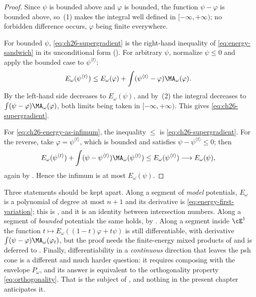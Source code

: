 \begin{proof}
Since $\psi$ is bounded above and $\varphi$ is bounded, the function
$\psi-\varphi$ is bounded above, so
\,(1) makes the integral well defined in
$[-\infty,+\infty)$; no forbidden difference occurs, $\varphi$ being
finite everywhere.

For bounded $\psi$, \eqref{eq:ch26-supergradient} is the right-hand
inequality of \eqref{eq:energy-sandwich} in its unconditional form
().  For arbitrary $\psi$, normalize
$\psi\leq0$ and apply the bounded case to
$\psi^{\langle t\rangle}$:
\[
 E_\omega(\psi^{\langle t\rangle})
 \leq E_\omega(\varphi)
   +\int(\psi^{\langle t\rangle}-\varphi)\MA_\omega(\varphi).
\]
By  the left-hand side decreases to
$E_\omega(\psi)$, and by
\,(2) the integral decreases to
$\int(\psi-\varphi)\MA_\omega(\varphi)$, both limits being taken in
$[-\infty,+\infty)$.  This gives \eqref{eq:ch26-supergradient}.

For \eqref{eq:ch26-energy-as-infimum}, the inequality $\leq$ is
\eqref{eq:ch26-supergradient}.  For the reverse, take
$\varphi=\psi^{\langle t\rangle}$, which is bounded and satisfies
$\psi-\psi^{\langle t\rangle}\leq0$; then
\[
 E_\omega(\psi^{\langle t\rangle})
  +\int(\psi-\psi^{\langle t\rangle})
    \MA_\omega(\psi^{\langle t\rangle})
 \leq E_\omega(\psi^{\langle t\rangle})
 \longrightarrow E_\omega(\psi),
\]
again by .  Hence the infimum is at most
$E_\omega(\psi)$.
\end{proof}

\begin{remark}
\label{rem:ch26-differentiability-scope}
Three statements should be kept apart.  Along a segment of \emph{model}
potentials, $E_\omega$ is a polynomial of degree at most $n+1$ and its
derivative is \eqref{eq:energy-first-variation}; this is
, and it is an identity between intersection
numbers.  Along a segment of \emph{bounded} potentials the same holds, by
.  Along a segment inside $\cE^1$ the
function $t\mapsto E_\omega((1-t)\varphi+t\psi)$ is still differentiable,
with derivative $\int(\psi-\varphi)\MA_\omega(\varphi_t)$, but the proof
needs the finite-energy mixed products of
 and is deferred to
.  Finally, differentiability in a
\emph{continuous} direction that leaves the psh cone is a different and much
harder question: it requires composing with the envelope $P_\omega$, and
its answer is equivalent to the orthogonality property
\eqref{eq:orthogonality}.  That is the subject of
, and nothing in the present chapter
anticipates it.
\end{remark}

